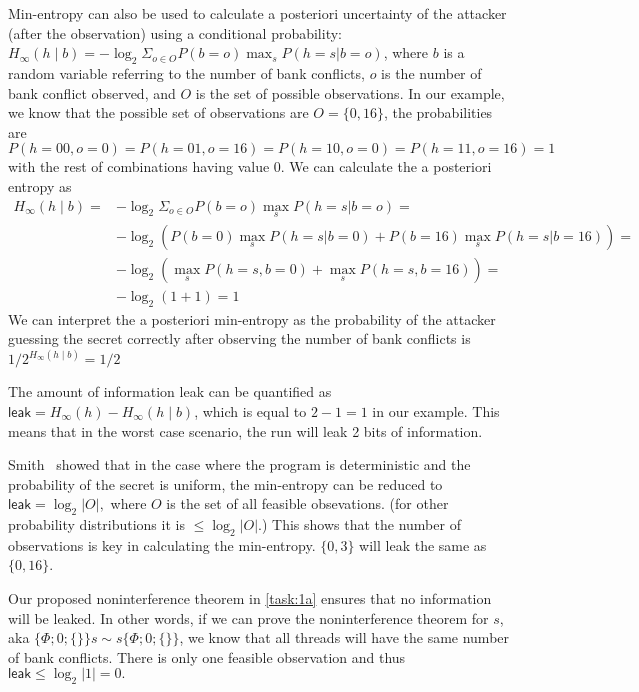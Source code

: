 Min-entropy can also be used to calculate a posteriori uncertainty of the attacker  (after the observation) using a conditional probability:
$H_\infty(h\mid b)=-\log_2\Sigma_{o\in O} P(b=o) \max_s P(h=s|b=o)$,
where $b$ is a random variable referring to the number of bank conflicts, $o$ is the number of bank conflict observed, and $O$ is the set of possible observations.
%
In our example, we know that the possible set of observations are $O=\{0,16\}$, the probabilities are $P(h=00,o=0)=P(h=01,o=16)=P(h=10,o=0)=P(h=11,o=16)=1$ with the rest of combinations having value $0$.
%
We can calculate the a posteriori entropy as 
\[\begin{array}{ll}
    H_\infty(h\mid b)=&-\log_2\Sigma_{o\in O} P(b=o) \max_s P(h=s|b=o)=\\ &-\log_2 (P(b=0)\max_s P(h=s|b=0) + P(b=16)\max_s P(h=s|b=16))=\\
    &
    -\log_2 (\max_s P(h=s,b=0) + \max_s P(h=s,b=16))=\\
    & 
    -\log_2 (1+1)= 1
\end{array}\]
We can interpret the a posteriori min-entropy as the probability of the attacker guessing the secret correctly after observing the number of bank conflicts is $1/2^{ H_\infty(h\mid b)}= 1/2$

The amount of information leak can be quantified as $\mathsf{leak}= H_\infty(h) - H_\infty(h\mid b)$, which is equal to $2-1=1$ in our example.
%
This means that in the worst case scenario, the run will leak 2 bits of information.


Smith~\cite{smith} showed that in the case where the program is deterministic and the probability of the secret is uniform, the min-entropy can be reduced to $\mathsf{leak}=\log_2 |O|,$ where $O$ is the set of all feasible obsevations. 
%
(for other probability distributions it is $\le \log_2 |O|.$)
%
This shows that the number of observations is key in calculating the min-entropy. 
%
$\{0,3\}$ will leak the same as $\{0,16\}$.

Our proposed noninterference theorem in \ref{task:1a} ensures that no information will be leaked.
%
In other words, if we can prove the noninterference theorem for $s$, aka $\{\Phi;0; \{\}\}s \sim s\{\Phi;0;\{\}\}$, we know that all threads will have the same number of bank conflicts.
%
There is only one feasible observation and thus $\mathsf{leak}\le \log_2 |1|=0.$

